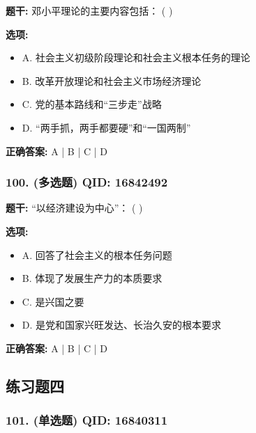 \documentclass[12pt,UTF8]{ctexart}
\begin{document}
\textbf{题干:}
邓小平理论的主要内容包括： ( )

\textbf{选项:}
\begin{itemize}[leftmargin=*]

  \item A. 社会主义初级阶段理论和社会主义根本任务的理论

  \item B. 改革开放理论和社会主义市场经济理论

  \item C. 党的基本路线和“三步走”战略

  \item D. “两手抓，两手都要硬”和“一国两制”

\end{itemize}

\textbf{正确答案:}
A | B | C | D

\vspace{0.3em}\hrulefill\vspace{0.7em}

\subsubsection*{100. (多选题) \small QID: 16842492}

\textbf{题干:}
“以经济建设为中心”： ( )

\textbf{选项:}
\begin{itemize}[leftmargin=*]

  \item A. 回答了社会主义的根本任务问题

  \item B. 体现了发展生产力的本质要求

  \item C. 是兴国之要

  \item D. 是党和国家兴旺发达、长治久安的根本要求

\end{itemize}

\textbf{正确答案:}
A | B | C | D

\vspace{0.3em}\hrulefill\vspace{0.7em}

\subsection*{练习题四}

\subsubsection*{101. (单选题) \small QID: 16840311}
\end{document}
